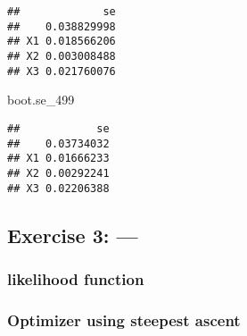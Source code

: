 \documentclass[]{article}
\newenvironment{Shaded}{\begin{snugshade}}{\end{snugshade}}
\newcommand{\KeywordTok}[1]{\textcolor[rgb]{0.13,0.29,0.53}{\textbf{#1}}}
\newcommand{\DataTypeTok}[1]{\textcolor[rgb]{0.13,0.29,0.53}{#1}}
\newcommand{\DecValTok}[1]{\textcolor[rgb]{0.00,0.00,0.81}{#1}}
\newcommand{\FloatTok}[1]{\textcolor[rgb]{0.00,0.00,0.81}{#1}}
\newcommand{\StringTok}[1]{\textcolor[rgb]{0.31,0.60,0.02}{#1}}
\newcommand{\CommentTok}[1]{\textcolor[rgb]{0.56,0.35,0.01}{\textit{#1}}}
\newcommand{\ControlFlowTok}[1]{\textcolor[rgb]{0.13,0.29,0.53}{\textbf{#1}}}
\newcommand{\OperatorTok}[1]{\textcolor[rgb]{0.81,0.36,0.00}{\textbf{#1}}}
\newcommand{\NormalTok}[1]{#1}
\begin{document}
\begin{verbatim}
##             se
##    0.038829998
## X1 0.018566206
## X2 0.003008488
## X3 0.021760076
\end{verbatim}

\begin{Shaded}
\begin{Highlighting}[]
\NormalTok{boot.se_}\DecValTok{499}
\end{Highlighting}
\end{Shaded}

\begin{verbatim}
##            se
##    0.03734032
## X1 0.01666233
## X2 0.00292241
## X3 0.02206388
\end{verbatim}

\subsection{Exercise 3: ---}\label{exercise-3}

\subsubsection{likelihood function}\label{likelihood-function}

\begin{Shaded}
\end{Shaded}

\subsubsection{Optimizer using steepest
ascent}\label{optimizer-using-steepest-ascent}
\end{document}
